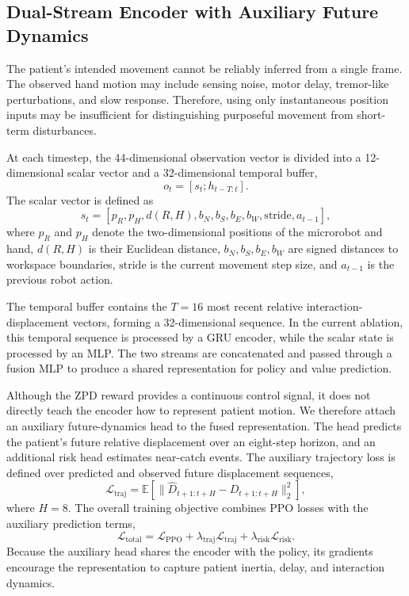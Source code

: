 \documentclass[lettersize,journal]{IEEEtran}
\begin{document}
\subsection{Dual-Stream Encoder with Auxiliary Future Dynamics}
The patient's intended movement cannot be reliably inferred from a single frame. The observed hand motion may include sensing noise, motor delay, tremor-like perturbations, and slow response. Therefore, using only instantaneous position inputs may be insufficient for distinguishing purposeful movement from short-term disturbances.

At each timestep, the 44-dimensional observation vector is divided into a 12-dimensional scalar vector and a 32-dimensional temporal buffer,
\begin{equation}
    o_t = [s_t; h_{t-T:t}].
\end{equation}
The scalar vector is defined as
\begin{equation}
    s_t = [p_R, p_H, d(R,H), b_N,b_S,b_E,b_W, \mathrm{stride}, a_{t-1}],
\end{equation}
where $p_R$ and $p_H$ denote the two-dimensional positions of the microrobot and hand, $d(R,H)$ is their Euclidean distance, $b_N,b_S,b_E,b_W$ are signed distances to workspace boundaries, $\mathrm{stride}$ is the current movement step size, and $a_{t-1}$ is the previous robot action.

The temporal buffer contains the $T=16$ most recent relative interaction-displacement vectors, forming a 32-dimensional sequence. In the current ablation, this temporal sequence is processed by a GRU encoder, while the scalar state is processed by an MLP. The two streams are concatenated and passed through a fusion MLP to produce a shared representation for policy and value prediction.

Although the ZPD reward provides a continuous control signal, it does not directly teach the encoder how to represent patient motion. We therefore attach an auxiliary future-dynamics head to the fused representation. The head predicts the patient's future relative displacement over an eight-step horizon, and an additional risk head estimates near-catch events. The auxiliary trajectory loss is defined over predicted and observed future displacement sequences,
\begin{equation}
    \mathcal{L}_{\mathrm{traj}} = \mathbb{E}\left[\|\hat{D}_{t+1:t+H} - D_{t+1:t+H}\|_2^2\right],
\end{equation}
where $H=8$. The overall training objective combines PPO losses with the auxiliary prediction terms,
\begin{equation}
    \mathcal{L}_{\mathrm{total}} = \mathcal{L}_{\mathrm{PPO}} + \lambda_{\mathrm{traj}}\mathcal{L}_{\mathrm{traj}} + \lambda_{\mathrm{risk}}\mathcal{L}_{\mathrm{risk}}.
\end{equation}
Because the auxiliary head shares the encoder with the policy, its gradients encourage the representation to capture patient inertia, delay, and interaction dynamics.
\end{document}

